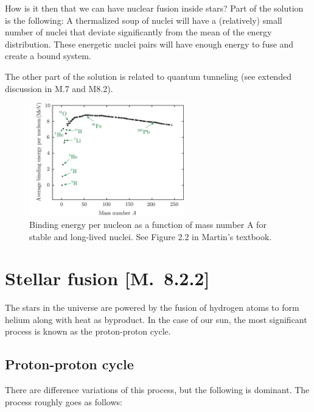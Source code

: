 \documentclass[a4paper,12pt]{article}
\theoremstyle{remark}
\renewcommand{\=}[1]{\stackrel{#1}{=}} %
\theoremstyle{plain}
\theoremstyle{definition}
\begin{document}
How is it then that we can have nuclear fusion inside stars? Part of the solution is the following: A thermalized soup of nuclei will have a (relatively) small number of nuclei that deviate significantly from the mean of the energy distribution. These energetic nuclei pairs will have enough energy to fuse and create a bound system.

The other part of the solution is related to quantum tunneling (see extended discussion in M.7 and M8.2).

\begin{figure}[t]
\begin{center}
    \includegraphics*[angle=0,width=0.6\textwidth]{img/fig1.png}
    \caption[Binding energy per nucleon]{Binding energy per nucleon as a function of mass number A for stable and long-lived nuclei. See Figure 2.2 in Martin's textbook.}
\label{fig:binding_energy}
\end{center}
\end{figure}

\section{Stellar fusion [M.\ 8.2.2]}
The stars in the universe are powered by the fusion of hydrogen atoms to form helium along with heat as byproduct. In the case of our sun, the most significant process is known as the proton-proton cycle.
\subsection{Proton-proton cycle}
There are difference variations of this process, but the following is dominant. The process roughly goes as follows:
 
\end{document}
